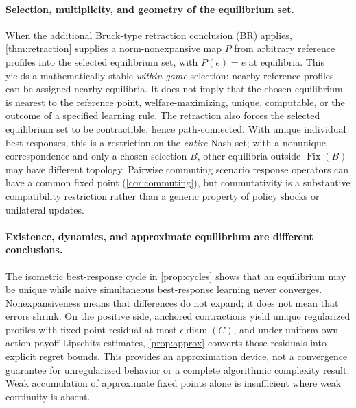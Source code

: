 \documentclass[11pt]{article}
\theoremstyle{definition}\newtheorem{definition}[theorem]{Definition}
\newcommand{\Fix}{\operatorname{Fix}}
\begin{document}
\paragraph{Selection, multiplicity, and geometry of the equilibrium set.}
When the additional Bruck-type retraction conclusion (BR) applies, \cref{thm:retraction} supplies a norm-nonexpansive map $P$ from arbitrary reference profiles into the selected equilibrium set, with $P(e)=e$ at equilibria. This yields a mathematically stable \emph{within-game} selection: nearby reference profiles can be assigned nearby equilibria. It does not imply that the chosen equilibrium is nearest to the reference point, welfare-maximizing, unique, computable, or the outcome of a specified learning rule. The retraction also forces the selected equilibrium set to be contractible, hence path-connected. With unique individual best responses, this is a restriction on the \emph{entire} Nash set; with a nonunique correspondence and only a chosen selection $B$, other equilibria outside $\Fix(B)$ may have different topology. Pairwise commuting scenario response operators can have a common fixed point (\cref{cor:commuting}), but commutativity is a substantive compatibility restriction rather than a generic property of policy shocks or unilateral updates.

\paragraph{Existence, dynamics, and approximate equilibrium are different conclusions.}
The isometric best-response cycle in \cref{prop:cycles} shows that an equilibrium may be unique while naive simultaneous best-response learning never converges. Nonexpansiveness means that differences do not expand; it does not mean that errors shrink. On the positive side, anchored contractions yield unique regularized profiles with fixed-point residual at most $\epsilon\operatorname{diam}(C)$, and under uniform own-action payoff Lipschitz estimates, \cref{prop:approx} converts those residuals into explicit regret bounds. This provides an approximation device, not a convergence guarantee for unregularized behavior or a complete algorithmic complexity result. Weak accumulation of approximate fixed points alone is insufficient where weak continuity is absent.
\end{document}

